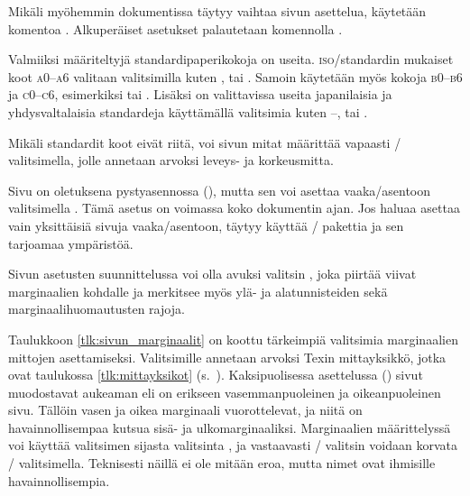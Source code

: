 Mikäli myöhemmin dokumentissa täytyy vaihtaa sivun asettelua, käytetään
komentoa . Alkuperäiset asetukset palautetaan
komennolla .

\begin{koodilohkosis}
\restoregeometry     %
\end{koodilohkosis}

Valmiiksi määriteltyjä standardipaperikokoja on useita.
\textsc{iso}\-/standardin mukaiset koot \textsc{a0}--\textsc{a6}
valitaan valitsimilla kuten  ,
 tai . Samoin käytetään myös kokoja
\textsc{b0}--\textsc{b6} ja \textsc{c0}--\textsc{c6}, esimerkiksi
 tai . Lisäksi on valittavissa useita
japanilaisia ja yhdysvaltalaisia standardeja käyttämällä valitsimia
kuten --,  tai
.

Mikäli standardit koot eivät riitä, voi sivun mitat määrittää vapaasti
\-/ valitsimella, jolle annetaan arvoksi leveys- ja
korkeusmitta.

\begin{koodilohkosis}
\end{koodilohkosis}

Sivu on oletuksena pystyasennossa (), mutta sen voi
asettaa vaaka\-/asentoon valitsimella . Tämä asetus on
voimassa koko dokumentin ajan. Jos haluaa asettaa vain yksittäisiä
sivuja vaaka\-/asentoon, täytyy käyttää \-/
pakettia ja sen tarjoamaa ympäristöä.

Sivun asetusten suunnittelussa voi olla avuksi valitsin
, joka piirtää viivat marginaalien kohdalle ja
merkitsee myös ylä- ja alatunnisteiden sekä marginaalihuomautusten
rajoja.

Taulukkoon \ref{tlk:sivun_marginaalit} on koottu tärkeimpiä valitsimia
marginaalien mittojen asettamiseksi. Valitsimille annetaan arvoksi Texin
mittayksikkö, jotka ovat taulukossa \ref{tlk:mittayksikot}
(s.~\pageref{tlk:mittayksikot}). Kaksipuolisessa
 
asettelussa () sivut muodostavat aukeaman eli
on erikseen vasemmanpuoleinen ja oikeanpuoleinen sivu. Tällöin vasen ja
oikea marginaali vuorottelevat, ja niitä on havainnollisempaa kutsua
sisä- ja ulkomarginaaliksi. Marginaalien määrittelyssä voi käyttää
valitsimen  sijasta valitsinta , ja vastaavasti
\-/ valitsin voidaan korvata \-/ valitsimella.
Teknisesti näillä ei ole mitään eroa, mutta nimet ovat ihmisille
havainnollisempia.

